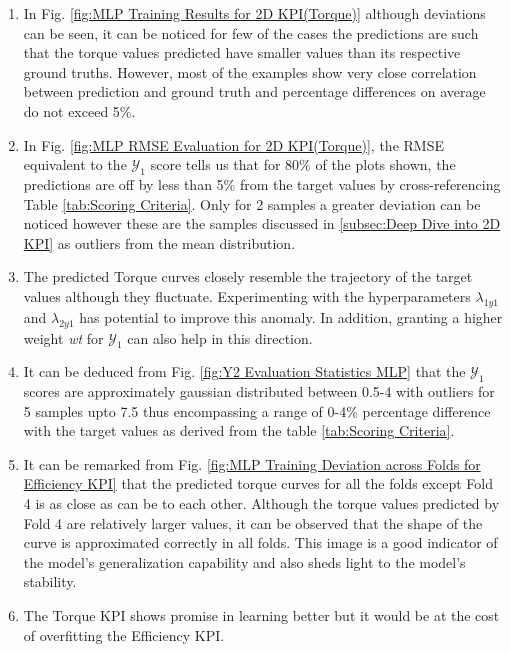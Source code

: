 \documentclass{report} %
\begin{document}
\begin{enumerate}[nosep]
    \item In Fig. \ref{fig:MLP Training Results for 2D KPI(Torque)} although deviations can be seen, it can be noticed for few of the cases the predictions are such 
    that the torque values predicted have smaller values than its respective ground truths. However, most of the examples show very close correlation between prediction 
    and ground truth and percentage differences on average do not exceed 5\%. 
    \item In Fig. \ref{fig:MLP RMSE Evaluation for 2D KPI(Torque)}, the \ac{RMSE} equivalent to the $\mathcal{Y}_1$ score tells us that for 80\% of the plots shown, 
    the predictions are off by less than 5\% from the target values by cross-referencing Table \ref{tab:Scoring Criteria}. 
    Only for 2 samples a greater deviation can be noticed however these are the samples discussed in 
    \ref{subsec:Deep Dive into 2D KPI} as outliers from the mean distribution. 
    \item The predicted Torque curves closely resemble the trajectory of the target values although they fluctuate. Experimenting with the hyperparameters 
    \textit{$\lambda_{1y1}$} and \textit{$\lambda_{2y1}$} has potential to improve this anomaly. In addition, granting a higher weight \textit{wt} for $\mathcal{Y}_1$ 
    can also help in this direction.
    \item It can be deduced from Fig. \ref{fig:Y2 Evaluation Statistics MLP} that the $\mathcal{Y}_1$ scores are approximately gaussian distributed between 
    0.5-4 with outliers for 5 samples upto 7.5 thus encompassing a range of 0-4\% percentage difference with the target values as derived from the table \ref{tab:Scoring Criteria}.
    \item It can be remarked from Fig. \ref{fig:MLP Training Deviation across Folds for Efficiency KPI} that the predicted torque curves for all the folds except Fold 4 
    is as close as can be to each other. Although the torque values predicted by Fold 4 are relatively larger values, it can be observed that the shape of the curve is 
    approximated correctly in all folds. This image is a good indicator of the model's generalization capability and also sheds light to the model's stability.
    \item The Torque \ac{KPI} shows promise in learning better but it would be at the cost of overfitting the Efficiency \ac{KPI}.
    \\
\end{enumerate}
\end{document}
